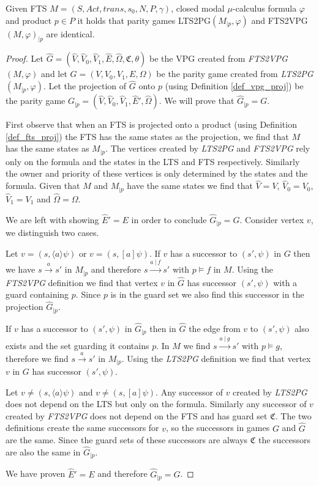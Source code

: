 \begin{lemma}
	\label{lem_VPG_proj_is_FTS_proj}
	Given FTS $M = (S, Act, trans, s_0, N, P, \gamma)$, closed modal $\mu$-calculus formula $\varphi$ and product $p \in P$ it holds that parity games LTS2PG$(M_{|p}, \varphi)$ and FTS2VPG$(M, \varphi)_{|p}$ are identical.
	\begin{proof}
		Let $\hat{G} = (\hat{V},\hat{V}_0,\hat{V}_1,\hat{E},\hat{\Omega},\mathfrak{C},\theta)$ be the VPG created from \textit{FTS2VPG}$(M,\varphi)$ and let $G = (V,V_0,V_1,E,\Omega)$ be the parity game created from \textit{LTS2PG}$(M_{|p},\varphi)$. Let the projection of $\hat{G}$ onto $p$ (using Definition \ref{def_vpg_proj}) be the parity game $G_{|p} = (\hat{V},\hat{V}_0,\hat{V}_1,\hat{E}',\hat{\Omega})$. We will prove that $\hat{G}_{|p} = G$.
		
		First observe that when an FTS is projected onto a product (using Definition \ref{def_fts_proj}) the FTS has the same states as the projection, we find that $M$ has the same states as $M_{|p}$. The vertices created by \textit{LTS2PG} and \textit{FTS2VPG} rely only on the formula and the states in the LTS and FTS respectively. Similarly the owner and priority of these vertices is only determined by the states and the formula. Given that $M$ and $M_{|p}$ have the same states we find that $\hat{V} = V$, $\hat{V}_0 = V_0$, $\hat{V}_1 = V_1$ and $\hat{\Omega} = \Omega$.
		
		We are left with showing $\hat{E}' = E$ in order to conclude $\hat{G}_{|p} = G$. Consider vertex $v$, we distinguish two cases. 
		
		Let $v = (s,\langle a \rangle \psi)$ or $v = (s,[a] \psi)$. If $v$ has a successor to $(s',\psi)$ in $G$ then we have $s \xrightarrow{a} s'$ in $M_{|p}$ and therefore $s \xrightarrow{a\ |\ f} s'$ with $p \models f$ in $M$. Using the \textit{FTS2VPG} definition we find that vertex $v$ in $\hat{G}$ has successor $(s',\psi)$ with a guard containing $p$. Since $p$ is in the guard set we also find this successor in the projection $\hat{G}_{|p}$. 
		
		If $v$ has a successor to $(s',\psi)$ in $\hat{G}_{|p}$ then in $\hat{G}$ the edge from $v$ to $(s',\psi)$ also exists and the set guarding it contains $p$. In $M$ we find $s \xrightarrow{a\ |\ g} s'$ with $p \models g$, therefore we find $s \xrightarrow{a} s'$ in $M_{|p}$. Using the \textit{LTS2PG} definition we find that vertex $v$ in $G$ has successor $(s',\psi)$.
		
		Let $v \neq (s,\langle a \rangle \psi)$ and $v \neq (s,[a]\psi)$. Any successor of $v$ created by \textit{LTS2PG} does not depend on the LTS but only on the formula. Similarly any successor of $v$ created by \textit{FTS2VPG} does not depend on the FTS and has guard set $\mathfrak{C}$. The two definitions create the same successors for $v$, so the successors in games $G$ and $\hat{G}$ are the same. Since the guard sets of these successors are always $\mathfrak{C}$ the successors are also the same in $\hat{G}_{|p}$.
		
		We have proven $\hat{E}' = E$ and therefore $\hat{G}_{|p} = G$.
	\end{proof}
\end{lemma}
